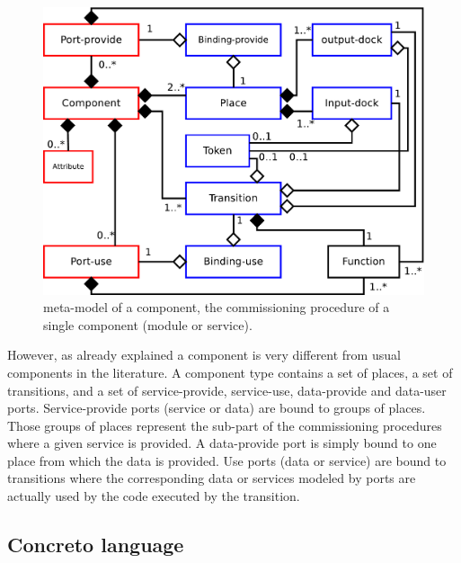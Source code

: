 \begin{figure}[tbp]
  \begin{center}
    \includegraphics[width=0.9\linewidth]{./images/component_uml.pdf}
  \end{center}
  \caption{\mad meta-model of a component, \ie the commissioning
    procedure of a single component (\ie module or service).}
  \label{fig:mmcomp}
\end{figure}

However, as already explained a \mad component is very different
from usual components in the literature. A component type contains a
set of places, a set of transitions, and a set of service-provide,
service-use, data-provide and data-user ports.
Service-provide ports (service or data) are bound to groups of
places. Those groups of places represent the sub-part of the
commissioning procedures where a given service is provided. A
data-provide port is simply bound to one place from which the data is
provided. Use ports (data or service) are bound to transitions where
the corresponding data or services modeled by ports are actually used
by the code executed by the transition.

\subsection{Concreto language}


